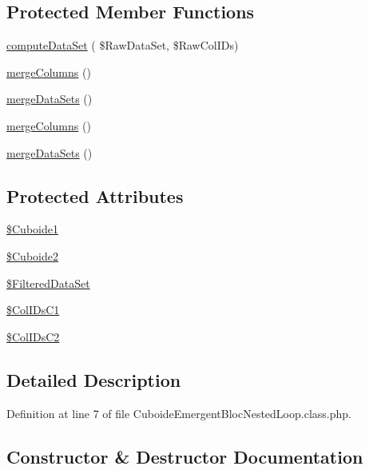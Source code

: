 \subsection*{Protected Member Functions}
\begin{DoxyCompactItemize}
\item 
\hyperlink{class_cuboide_emergent_a339e24b7edf88b70d3524586aad0198b}{compute\+Data\+Set} ( \$Raw\+Data\+Set, \$Raw\+Col\+I\+Ds)
\item 
\hyperlink{class_cuboide_emergent_afa115b70971c1b778813134a55406144}{merge\+Columns} ()
\item 
\hyperlink{class_cuboide_emergent_af81c6eabb87ff572c306a96334c7062d}{merge\+Data\+Sets} ()
\item 
\hyperlink{class_cuboide_emergent_afa115b70971c1b778813134a55406144}{merge\+Columns} ()
\item 
\hyperlink{class_cuboide_emergent_af81c6eabb87ff572c306a96334c7062d}{merge\+Data\+Sets} ()
\end{DoxyCompactItemize}
\subsection*{Protected Attributes}
\begin{DoxyCompactItemize}
\item 
\hyperlink{class_cuboide_emergent_a0785898593ced152251f1c85e6255712}{\$\+Cuboide1}
\item 
\hyperlink{class_cuboide_emergent_ab0667ba0cbc1d20d57029823a0d3e2c3}{\$\+Cuboide2}
\item 
\hyperlink{class_cuboide_emergent_a815e09d9220a06a4986e3b4f2a224e6c}{\$\+Filtered\+Data\+Set}
\item 
\hyperlink{class_cuboide_emergent_ac22d5c3ee5743695016047ae7ca14534}{\$\+Col\+I\+Ds\+C1}
\item 
\hyperlink{class_cuboide_emergent_ac818bc5f5c2d77382607d8fbd5df3608}{\$\+Col\+I\+Ds\+C2}
\end{DoxyCompactItemize}


\subsection{Detailed Description}


Definition at line 7 of file Cuboide\+Emergent\+Bloc\+Nested\+Loop.\+class.\+php.



\subsection{Constructor \& Destructor Documentation}
\mbox{\label{class_cuboide_emergent_a1d8825c7b39273e211f0615a17f5bfff}} 

